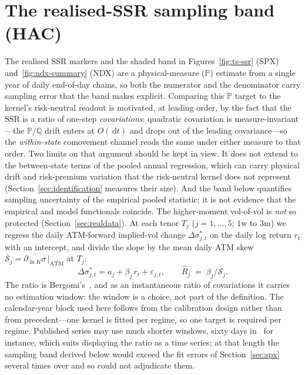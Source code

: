 \documentclass[11pt]{article}
\providecommand{\1}{\mathbf 1}
\newcommand{\dd}{\,\mathrm{d}}
\begin{document}
\section{The realised-SSR sampling band (HAC)}
\label{app:hac}
The realised SSR markers and the shaded band in Figures~\ref{fig:ts-ssr} (SPX) and~\ref{fig:ndx-summary}
(NDX) are a physical-measure ($\mathbb P$) estimate from a single year of daily end-of-day chains, so
both the numerator and the denominator carry sampling error that the band makes explicit. Comparing this
$\mathbb P$ target to the kernel's risk-neutral readout is motivated, at leading order, by the fact that the
SSR is a ratio of one-step \emph{covariations}: quadratic covariation is measure-invariant---the
$\mathbb P$/$\mathbb Q$ drift enters at $O(\dd t)$ and drops out of the leading covariance---so the
\emph{within-state} comovement channel reads the same under either measure to that order. Two limits on
that argument should be kept in view. It does not extend to the between-state terms of the pooled annual
regression, which can carry physical drift and risk-premium variation that the risk-neutral kernel does not
represent (Section~\ref{sec:identification} measures their size). And the band below quantifies sampling
uncertainty of the empirical pooled statistic; it is not evidence that the empirical and model functionals
coincide. The higher-moment vol-of-vol is \emph{not} so protected (Section~\ref{sec:realdata}). At each tenor
$T_j$ ($j=1,\dots,5$; $1$w to $3$m) we regress the daily ATM-forward implied-vol change
$\Delta\sigma^\ast_{j,t}$ on the daily log return $r_t$ with an intercept, and divide the slope by the mean
daily ATM skew $\bar{\mathcal S}_j=\overline{\partial_{\ln K}\sigma}\,|_{\mathrm{ATM}}$ at $T_j$:
\begin{equation}
  \Delta\sigma^\ast_{j,t} = a_j + \beta_j\, r_t + \varepsilon_{j,t},
  \qquad
  \widehat{R}_j \;=\; \beta_j\big/\bar{\mathcal S}_j .
\end{equation}
The ratio is Bergomi's~\cite{bergomi2009,bergomi2016}, and as an instantaneous ratio of covariations
it carries no estimation window: the window is a choice, not part of the definition. The
calendar-year block used here follows from the calibration design rather than from precedent---one
kernel is fitted per regime, so one target is required per regime. Published series may use much
shorter windows, sixty days in~\cite{abijaber2025} for instance, which suits displaying the ratio as
a time series; at that length the sampling band derived below would exceed the fit errors of
Section~\ref{sec:spx} several times over and so could not adjudicate them.
\end{document}
